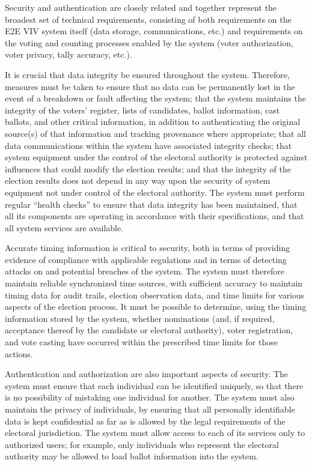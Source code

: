 Security and authentication are closely related and together represent
the broadest set of technical requirements, consisting of both
requirements on the E2E VIV system itself (data storage,
communications, etc.) and requirements on the voting and counting
processes enabled by the system (voter authorization, voter privacy,
tally accuracy, etc.).

It is crucial that data integrity be ensured throughout the
system. Therefore, measures must be taken to ensure that no data can
be permanently lost in the event of a breakdown or fault affecting the
system; that the system maintains the integrity of the voters'
register, lists of candidates, ballot information, cast ballots, and
other critical information, in addition to authenticating the original
source(s) of that information and tracking provenance where
appropriate; that all data communications within the system have
associated integrity checks; that system equipment under the control
of the electoral authority is protected against influences that could
modify the election results; and that the integrity of the election
results does not depend in any way upon the security of system
equipment not under control of the electoral authority. The system
must perform regular ``health checks'' to ensure that data integrity
has been maintained, that all its components are operating in
accordance with their specifications, and that all system services are
available.

Accurate timing information is critical to security, both in terms of
providing evidence of compliance with applicable regulations and in
terms of detecting attacks on and potential breaches of the
system. The system must therefore maintain reliable synchronized time
sources, with sufficient accuracy to maintain timing data for audit
trails, election observation data, and time limits for various aspects
of the election process. It must be possible to determine, using the
timing information stored by the system, whether nominations (and, if
required, acceptance thereof by the candidate or electoral authority),
voter registration, and vote casting have occurred within the
prescribed time limits for those actions.

Authentication and authorization are also important aspects of
security. The system must ensure that each individual can be
identified uniquely, so that there is no possibility of mistaking one
individual for another. The system must also maintain the privacy of
individuals, by ensuring that all personally identifiable data is kept
confidential as far as is allowed by the legal requirements of the
electoral jurisdiction. The system must allow access to each of its
services only to authorized users; for example, only individuals who
represent the electoral authority may be allowed to load ballot
information into the system.

